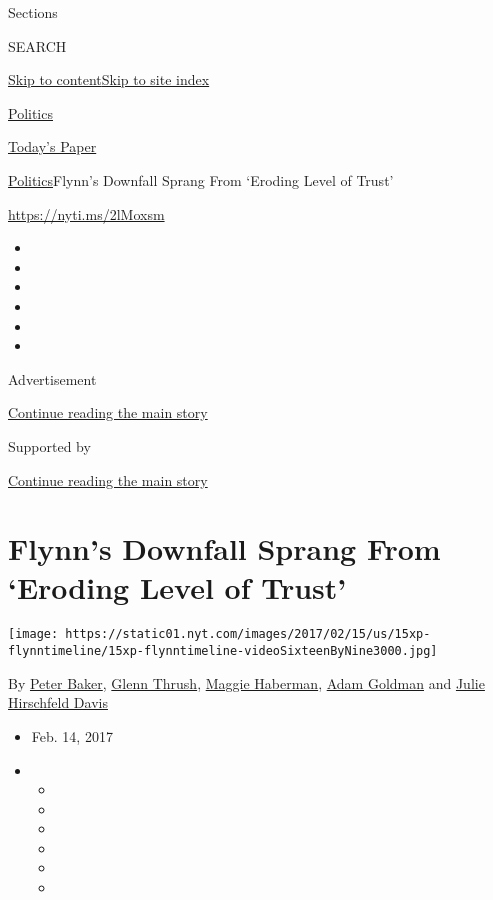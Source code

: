 Sections

SEARCH

\protect\hyperlink{site-content}{Skip to
content}\protect\hyperlink{site-index}{Skip to site index}

\href{https://www.nytimes.com/section/politics}{Politics}

\href{https://myaccount.nytimes.com/auth/login?response_type=cookie\&client_id=vi}{}

\href{https://www.nytimes.com/section/todayspaper}{Today's Paper}

\href{/section/politics}{Politics}\textbar{}Flynn's Downfall Sprang From
`Eroding Level of Trust'

\url{https://nyti.ms/2lMoxsm}

\begin{itemize}
\item
\item
\item
\item
\item
\item
\end{itemize}

Advertisement

\protect\hyperlink{after-top}{Continue reading the main story}

Supported by

\protect\hyperlink{after-sponsor}{Continue reading the main story}

\hypertarget{flynns-downfall-sprang-from-eroding-level-of-trust}{%
\section{Flynn's Downfall Sprang From `Eroding Level of
Trust'}\label{flynns-downfall-sprang-from-eroding-level-of-trust}}

\texttt{[image: https://static01.nyt.com/images/2017/02/15/us/15xp-flynntimeline/15xp-flynntimeline-videoSixteenByNine3000.jpg]}

By \href{http://www.nytimes.com/by/peter-baker}{Peter Baker},
\href{https://www.nytimes.com/by/glenn-thrush}{Glenn Thrush},
\href{http://www.nytimes.com/by/maggie-haberman}{Maggie Haberman},
\href{https://www.nytimes.com/by/adam-goldman}{Adam Goldman} and
\href{https://www.nytimes.com/by/julie-hirschfeld-davis}{Julie
Hirschfeld Davis}

\begin{itemize}
\item
  Feb. 14, 2017
\item
  \begin{itemize}
  \item
  \item
  \item
  \item
  \item
  \item
  \end{itemize}
\end{itemize}

